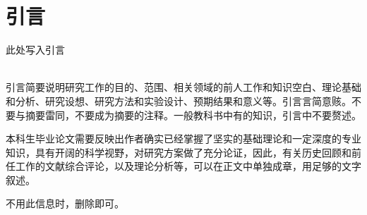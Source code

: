 \documentclass[UTF8]{ctexart}
\begin{document}
\part*{引言}
此处写入引言\\\\ \par
引言简要说明研究工作的目的、范围、相关领域的前人工作和知识空白、理论基础和分析、研究设想、研究方法和实验设计、预期结果和意义等。引言言简意赅。不要与摘要雷同，不要成为摘要的注释。一般教科书中有的知识，引言中不要赘述。\par
本科生毕业论文需要反映出作者确实已经掌握了坚实的基础理论和一定深度的专业知识，具有开阔的科学视野，对研究方案做了充分论证，因此，有关历史回顾和前任工作的文献综合评论，以及理论分析等，可以在正文中单独成章，用足够的文字叙述。\par
不用此信息时，删除即可。
\newpage
\end{document}
